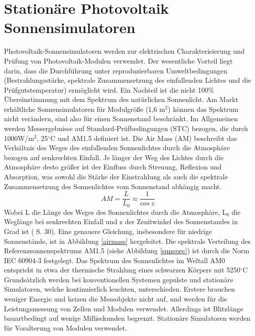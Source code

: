 \documentclass[a4paper,bibtotoc,oneside]{scrbook}
\begin{document}
\section{Stationäre Photovoltaik Sonnensimulatoren} \thispagestyle{empty}

Photovoltaik-Sonnensimulatoren werden zur elektrischen Charakterisierung und Prüfung von Photovoltaik-Modulen verwendet. Der wesentliche Vorteil liegt darin, dass die Durchführung unter reproduzierbaren Umweltbedingungen (Bestrahlungsstärke, spektrale Zusammensetzung des einfallenden Lichtes und die Prüfgutstemperatur)  ermöglicht wird. Ein Nachteil ist die nicht 100\% Übereinstimmung mit dem Spektrum des natürlichen Sonnenlicht. Am Markt erhältliche Sonnensimulatoren für Modulgröße (1,6 m$^2$) können das Spektrum nicht verändern, sind also für einen Sonnenstand beschränkt.
Im Allgemeinen werden Messergebnisse auf Standard-Prüfbedingungen (STC) bezogen, die durch 1000W/m$^2$, 25$^{\circ}$C und AM1.5 definiert ist. Die Air Mass (AM) beschreibt das Verhältnis des Weges des einfallenden Sonnenlichtes durch die Atmosphäre bezogen auf senkrechten Einfall. Je länger der Weg des Lichtes durch die Atmosphäre desto größer ist der Einfluss durch Streuung, Reflexion und Absorption, was sowohl die Stärke der Einstrahlung als auch die spektrale Zusammensetzung des Sonnenlichtes vom Sonnenstand abhängig macht.  \begin{equation}
     AM = \frac {L} {L_0} \approx \frac{1}{cos~ z}
\end{equation}
Wobei L die Länge des Weges des Sonnenlichtes durch die Atmosphäre, L$_0$ die Weglänge bei senkrechten Einfall und z der Zenitwinkel des Sonnenstandes in Grad ist (\cite{wurf} S. 30). 
Eine genauere Gleichung, insbesondere für niedrige Sonnenstände, ist in Abbildung \ref{airmass} hergeleitet.
Die spektrale Verteilung des Referenzsonnenspektrums AM1.5 (siehe Abbildung \ref{sunspec}) ist durch die Norm IEC 60904-3 \cite{norm3} festgelegt. Das Spektrum des Sonnenlichtes im Weltall AM0 entspricht in etwa der thermische Strahlung eines schwarzen Körpers mit 5250$^\circ$C
Grundsätzlich werden bei konventionellen Systemen gepulste und stationäre Simulatoren, welche kontinuierlich leuchten, unterschieden. Erstere brauchen weniger Energie und heizen die Messobjekte nicht auf, und werden für die Leistungsmessung von Zellen und Modulen verwendet. Allerdings ist Blitzlänge bauartbedingt auf wenige Millisekunden begrenzt. Stationäre Simulatoren werden für Voralterung von Modulen verwendet.
 
\end{document}
